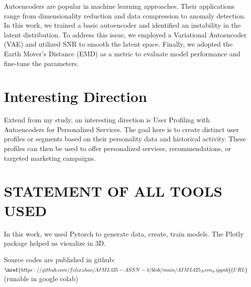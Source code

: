 \documentclass{article}
\begin{document}
Autoencoders are popular in machine learning approaches. Their applications range from dimensionality reduction and data compression to anomaly detection. In this work, we trained a basic autoencoder and identified an instability in the latent distribution. To address this issue, we employed a Variational Autoencoder (VAE) and utilized SNR to smooth the latent space. Finally, we adopted the Earth Mover's Distance (EMD) as a metric to evaluate model performance and fine-tune the parameters.

\section{Interesting Direction}
\label{sec:direction}

Extend from my study, an interesting direction is User Profiling with Autoencoders for Personalized Services.
The goal here is to create distinct user profiles or segments based on their personality data and historical activity. 
These profiles can then be used to offer personalized services, recommendations, or targeted marketing campaigns.

\section{STATEMENT OF ALL TOOLS USED}
\label{sec:statementofalltoolsused}

In this work, we used Pytorch to generate data, create, train models. 
The Plotly package helped us visualize in 3D. 

Source codes are published in github: 
$\href{https://github.com/felixzhao/AIML425-ASSN-4/blob/main/AIML425_Assn_4.ipynb}{URL}$
 (runable in google colab)




\vfill\pagebreak



\end{document}
